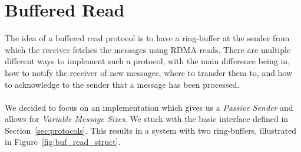 
\section{Buffered Read}\label{sec:conn:buf_read}

The idea of a buffered read protocol is to have a ring-buffer at the sender from which the receiver fetches the messages using
RDMA reads. There are multiple different ways to implement such a protocol, with the main difference being in, how to notify
the receiver of new messages, where to transfer them to, and how to acknowledge to the sender that a message has been processed.

\paragraph{} We decided to focus on an implementation which gives us a \emph{Passive Sender} and allows for 
\emph{Variable Message Sizes}. We stuck with the basic interface defined in Section~\ref{sec:protocols}. This 
results in a system with two ring-buffers, illustrated in Figure~\ref{fig:buf_read_struct}.

